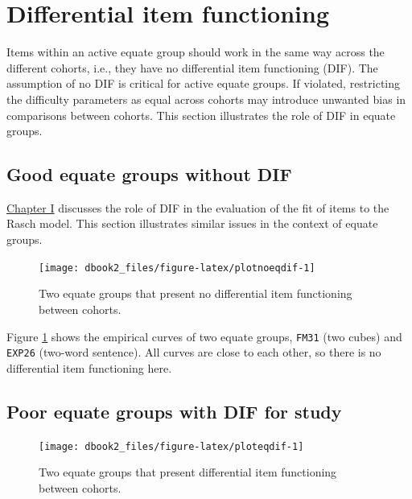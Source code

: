 \documentclass[
]{book}
\begin{document}
\hypertarget{sec:equatedif}{%
\section{Differential item functioning}\label{sec:equatedif}}

Items within an active equate group should work in the same way across the different cohorts, i.e., they have no differential item functioning (DIF). The assumption of no DIF is critical for active equate groups. If violated, restricting the difficulty parameters as equal across cohorts may introduce unwanted bias in comparisons between cohorts. This section illustrates the role of DIF in equate groups.

\hypertarget{good-equate-groups-without-dif}{%
\subsection{Good equate groups without DIF}\label{good-equate-groups-without-dif}}

\href{https://d-score.org/dbook1/sec-dif.html}{Chapter I} discusses the role of DIF in the evaluation of the fit of items to the Rasch model. This section illustrates similar issues in the context of equate groups.

\begin{figure}

{\centering \texttt{[image: dbook2\_files/figure-latex/plotnoeqdif-1]} 

}

\caption{Two equate groups that present no differential item functioning between cohorts.}\label{fig:plotnoeqdif}
\end{figure}



Figure \ref{fig:plotnoeqdif} shows the empirical curves of two equate groups, \texttt{FM31} (two cubes) and \texttt{EXP26} (two-word sentence). All curves are close to each other, so there is no differential item functioning here.

\hypertarget{poor-equate-groups-with-dif-for-study}{%
\subsection{Poor equate groups with DIF for study}\label{poor-equate-groups-with-dif-for-study}}

\begin{figure}

{\centering \texttt{[image: dbook2\_files/figure-latex/ploteqdif-1]} 

}

\caption{Two equate groups that present differential item functioning between cohorts.}\label{fig:ploteqdif}
\end{figure}
\end{document}
